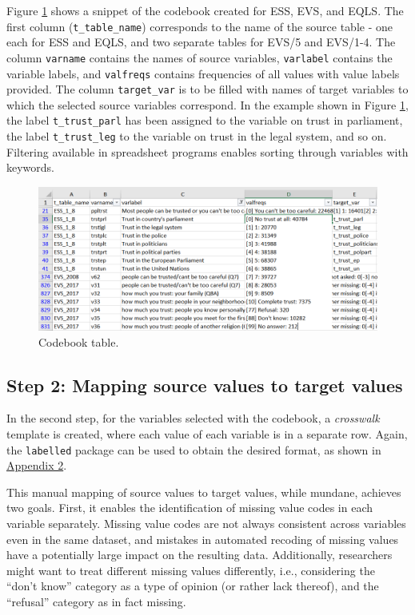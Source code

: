 \documentclass[12pt,]{article}
\begin{document}
Figure \ref{fig:codebook} shows a snippet of the codebook created for ESS, EVS, and EQLS. The first column (\texttt{t\_table\_name}) corresponds to the name of the source table - one each for ESS and EQLS, and two separate tables for EVS/5 and EVS/1-4. The column \texttt{varname} contains the names of source variables, \texttt{varlabel} contains the variable labels, and \texttt{valfreqs} contains frequencies of all values with value labels provided. The column \texttt{target\_var} is to be filled with names of target variables to which the selected source variables correspond. In the example shown in Figure \ref{fig:codebook}, the label \texttt{t\_trust\_parl} has been assigned to the variable on trust in parliament, the label \texttt{t\_trust\_leg} to the variable on trust in the legal system, and so on. Filtering available in spreadsheet programs enables sorting through variables with keywords.

\begin{figure}
\includegraphics[width=465px]{pictures/codebook_full} \caption{Codebook table.}\label{fig:codebook}
\end{figure}

\hypertarget{step-2-mapping-source-values-to-target-values}{%
\subsection{Step 2: Mapping source values to target values}\label{step-2-mapping-source-values-to-target-values}}

In the second step, for the variables selected with the codebook, a \emph{crosswalk} template is created, where each value of each variable is in a separate row. Again, the \texttt{labelled} package can be used to obtain the desired format, as shown in \protect\hyperlink{appendix2}{Appendix 2}.

This manual mapping of source values to target values, while mundane, achieves two goals. First, it enables the identification of missing value codes in each variable separately. Missing value codes are not always consistent across variables even in the same dataset, and mistakes in automated recoding of missing values have a potentially large impact on the resulting data. Additionally, researchers might want to treat different missing values differently, i.e., considering the ``don't know'' category as a type of opinion (or rather lack thereof), and the ``refusal'' category as in fact missing.
\end{document}
